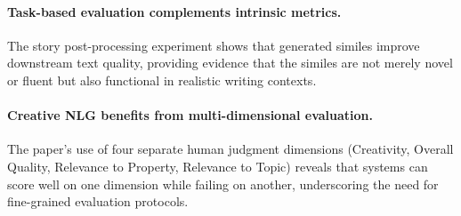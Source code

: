 \documentclass[12pt]{article}
\begin{document}
\paragraph{Task-based evaluation complements intrinsic metrics.} The story post-processing experiment shows that generated similes improve downstream text quality, providing evidence that the similes are not merely novel or fluent but also functional in realistic writing contexts.

\paragraph{Creative NLG benefits from multi-dimensional evaluation.} The paper's use of four separate human judgment dimensions (Creativity, Overall Quality, Relevance to Property, Relevance to Topic) reveals that systems can score well on one dimension while failing on another, underscoring the need for fine-grained evaluation protocols.
\end{document}
